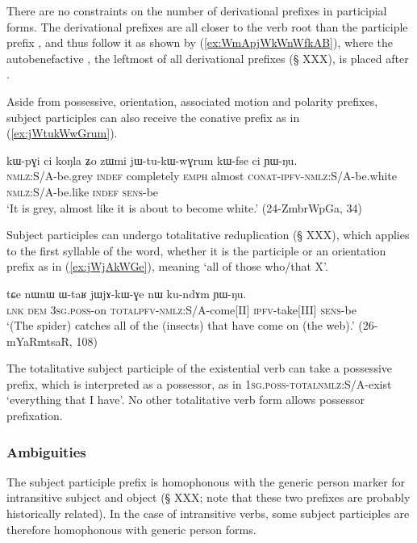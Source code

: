 There are no constraints on the number of derivational prefixes in participial forms. The derivational prefixes are all closer to the verb root than the participle prefix , and thus follow it as shown by (\ref{ex:WmApjWkWnWfkAB}), where the autobenefactive , the leftmost of all derivational prefixes (§ XXX), is placed after . 

Aside from possessive, orientation, associated motion and polarity prefixes, subject participles can also receive the conative prefix  as in (\ref{ex:jWtukWwGrum}).

 \begin{exe} 
\ex \label{ex:jWtukWwGrum}
\gll  kɯ-pɣi ci koŋla ʑo zɯmi jɯ-tu-kɯ-wɣrum kɯ-fse ci ɲɯ-ŋu.  \\
\textsc{nmlz}:S/A-be.grey \textsc{indef} completely \textsc{emph} almost \textsc{conat}-\textsc{ipfv}-\textsc{nmlz}:S/A-be.white \textsc{nmlz}:S/A-be.like \textsc{indef} \textsc{sens}-be \\
\glt `It is grey, almost like it is about to become white.'  (24-ZmbrWpGa, 34)
\end{exe}

Subject participles can undergo totalitative reduplication (§ XXX), which applies to the first syllable of the word, whether it is the participle  or an orientation prefix as in (\ref{ex:jWjAkWGe}), meaning `all of those who/that X'.

\begin{exe}
\ex \label{ex:jWjAkWGe}
\gll tɕe nɯnɯ ɯ-taʁ jɯ\redp{}jɤ-kɯ-ɣe nɯ ku-ndɤm ɲɯ-ŋu. \\
\textsc{lnk} \textsc{dem} \textsc{3sg}.\textsc{poss}-on \textsc{total}\redp{}\textsc{pfv}-\textsc{nmlz}:S/A-come[II] \textsc{ipfv}-take[III] \textsc{sens}-be \\
\glt `(The spider) catches all of the (insects) that have come on (the web).' (26-mYaRmtsaR, 108)
\end{exe}

The totalitative subject participle of the existential verb  can take a possessive prefix, which is interpreted as a possessor, as in  \textsc{1sg}.\textsc{poss}-\textsc{total}\redp{}\textsc{nmlz}:S/A-exist `everything that I have'. No other totalitative verb form allows possessor prefixation.

\subsubsection{Ambiguities}  \label{sec:subject.participle.ambiguities}
The subject participle  prefix is homophonous with the generic person marker for intransitive subject and object (§ XXX; note that these two prefixes are probably historically related). In the case of intransitive verbs, some subject participles are therefore homophonous with generic person forms. 


